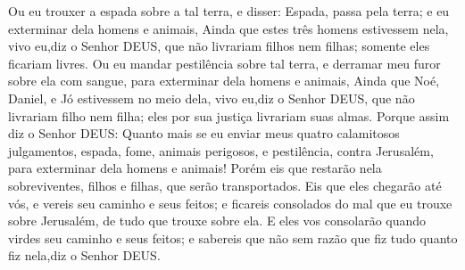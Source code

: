 {Ou
{} eu trouxer a espada sobre a tal terra, e disser: Espada, passa pela terra; e eu exterminar dela homens e animais,
Ainda que estes três homens estivessem nela, vivo eu,diz o Senhor DEUS, que não livrariam filhos nem filhas; somente eles ficariam livres.
Ou
{} eu mandar pestilência sobre tal terra, e derramar meu furor sobre ela com sangue, para exterminar dela homens e animais,
Ainda que Noé, Daniel, e Jó estivessem no meio dela, vivo eu,diz o Senhor DEUS, que não livrariam filho nem filha; eles por sua justiça livrariam suas
{} almas.
Porque assim diz o Senhor DEUS: Quanto mais se eu enviar meus quatro calamitosos
 julgamentos, espada, fome, animais perigosos, e pestilência, contra Jerusalém, para exterminar dela homens e animais!
Porém eis que restarão nela
{} sobreviventes, filhos e filhas, que serão transportados. Eis que eles chegarão até vós, e vereis seu caminho e seus feitos; e ficareis consolados do mal que eu trouxe sobre Jerusalém, de tudo que trouxe sobre ela.
E eles vos consolarão quando virdes seu caminho e seus feitos; e sabereis que não sem razão que fiz tudo quanto fiz nela,diz o Senhor DEUS.

\par }
